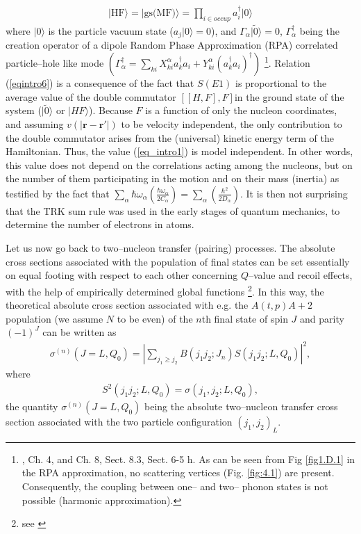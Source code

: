 \begin{align}
|\text{HF}\rangle=|\text{gs(MF)}\rangle=\prod_{i\in occup}a^\dagger_i |0\rangle
\end{align}
where $|0\rangle$ is the particle vacuum state ($a_j|0\rangle=0$), and $\Gamma_\alpha|\tilde 0\rangle=0$, $\Gamma^\dagger_\alpha$ being the creation operator of a dipole Random Phase Approximation (RPA) correlated particle--hole like mode $(\Gamma_\alpha^\dagger=\sum_{ki}X_{ki}^\alpha a_k^\dagger a_i+Y^\alpha_{ki}(a_k^\dagger a_i)^\dagger)$ \footnote{\cite{Bertsch:05}, Ch. 4, and \cite{Brink:05} Ch. 8, Sect. 8.3, \cite{Bohr:75} Sect. 6-5 h. As can be seen from Fig \ref{fig1.D.1} in the RPA approximation, no scattering vertices (Fig. \ref{fig:4.1}) are present. Consequently, the coupling between one-- and two-- phonon states is not possible (harmonic approximation).}. Relation (\ref{eqintro6}) is a consequence of the fact that $S(E1)$ is proportional to the average value of the double  commutator $[[H,F],F]$in the ground state of the system ($|\tilde 0\rangle$ or $|HF\rangle$). Because $F$ is a function of only the nucleon coordinates, and assuming $v(|\mathbf{r}-\mathbf{r}'|)$ to be velocity independent, the only contribution to the double commutator arises from the (universal) kinetic energy term of the Hamiltonian. Thus, the value (\ref{eq_intro1}) is model independent. In other words, this value does not depend on the correlations acting among the nucleons, but on the number of them participating in the motion and on their mass (inertia) as testified by the fact that $\sum_{\alpha}\hbar \omega_\alpha\left(\frac{\hbar\omega_\alpha}{2C_\alpha}\right)=\sum_{\alpha}\left(\frac{\hbar^2}{2D_\alpha}\right)$. It is then not surprising that the TRK sum rule was used in the early stages of quantum mechanics, to determine the number of electrons in atoms.


Let us now go back to two--nucleon transfer (pairing) processes. The  absolute cross sections associated with the population of  final states can be set essentially on equal footing with respect to each other  concerning  $Q$--value and recoil effects, with the help of empirically determined global functions \footnote{see \cite{Broglia:72b}}. In this way, the theoretical absolute cross section associated with e.g. the $A(t,p)A+2$ population (we assume $N$ to be even) of the $n$th final state of spin $J$ and parity $(-1)^J$ can be written as 
\begin{align}
\sigma^{(n)}(J=L,Q_0)=\left|\sum_{j_1\geq j_2}B(j_1 j_2;J_n)S(j_1 j_2 ;L,Q_0)\right|^2,
\end{align}
where
\begin{align}
S^2(j_1 j_2 ;L,Q_0)=\sigma(j_1,j_2;L,Q_0),
\end{align}
the quantity $\sigma^{(n)}(J=L,Q_0)$ being the absolute two--nucleon transfer cross section associated with the two particle configuration $(j_1,j_2)_L$.


